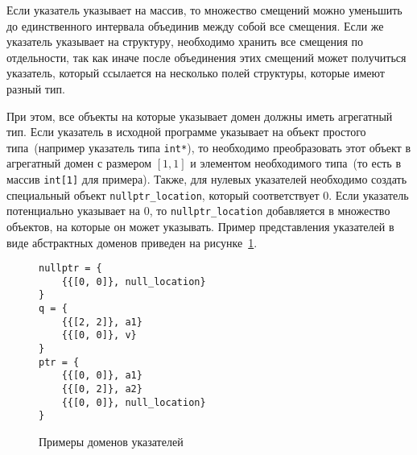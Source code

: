 Если указатель указывает на массив, то множество смещений можно уменьшить до 
единственного интервала объединив между собой все смещения. Если же указатель
указывает на структуру, необходимо хранить все смещения по отдельности, так
как иначе после объединения этих смещений может получиться указатель, который
ссылается на несколько полей структуры, которые имеют разный тип.

При этом, все объекты на которые указывает домен должны иметь агрегатный тип.
Если указатель в исходной программе указывает на объект простого типа~(например
указатель типа \texttt{int*}), то необходимо преобразовать этот объект в 
агрегатный домен с размером $[1, 1]$ и элементом необходимого типа~(то есть
в массив \texttt{int[1]} для примера). Также, для нулевых указателей
необходимо создать специальный объект \texttt{nullptr\_location}, который 
соответствует 0. Если указатель потенциально указывает на 0, то
\texttt{nullptr\_location} добавляется в множество объектов, на которые он 
может указывать. Пример представления указателей в виде абстрактных доменов
приведен на рисунке~\ref{image:memory}.
\begin{figure}[h!]
\begin{lstlisting}[style=nostyle]
nullptr = {
    {{[0, 0]}, null_location}
}
q = {
    {{[2, 2]}, a1}
    {{[0, 0]}, v}
}
ptr = {
    {{[0, 0]}, a1}
    {{[0, 2]}, a2}
    {{[0, 0]}, null_location}
}
\end{lstlisting}
\caption{Примеры доменов указателей}
\label{image:memory}
\end{figure}

